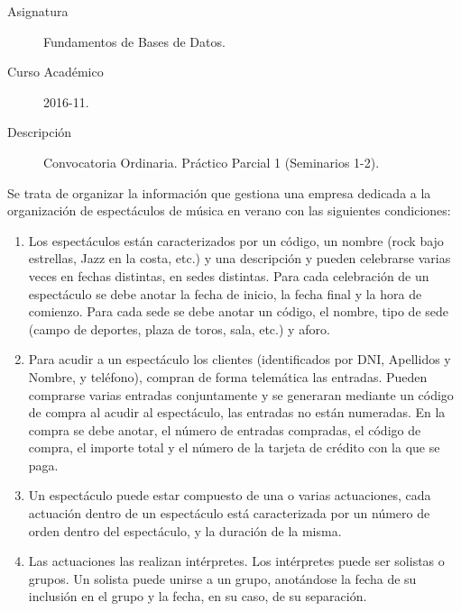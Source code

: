 \documentclass[12pt]{article}
\begin{document}

    
    

    \begin{description}
        \item[Asignatura] Fundamentos de Bases de Datos.
        \item[Curso Académico] 2016-11.
        \item[Descripción] Convocatoria Ordinaria. Práctico Parcial 1 (Seminarios 1-2).
    
    \end{description}
    \newpage

Se trata de organizar la información que gestiona una empresa dedicada a la organización de espectáculos de música en verano con las siguientes condiciones:
\begin{enumerate}
    \item Los espectáculos están caracterizados por un código, un nombre (rock bajo estrellas, Jazz en la costa, etc.) y una descripción y pueden celebrarse varias veces en fechas distintas, en sedes distintas. Para cada celebración de un espectáculo se debe anotar la fecha de inicio, la fecha final y la hora de comienzo. Para cada sede se debe anotar un código, el nombre, tipo de sede (campo de deportes, plaza de toros, sala, etc.) y aforo.
    \item Para acudir a un espectáculo los clientes (identificados por DNI, Apellidos y Nombre, y teléfono), compran de forma telemática las entradas. Pueden comprarse varias entradas conjuntamente y se generaran mediante un código de compra al acudir al espectáculo, las entradas no están numeradas. En la compra se debe anotar, el número de entradas compradas, el código de compra, el importe total y el número de la tarjeta de crédito con la que se paga.
    \item Un espectáculo puede estar compuesto de una o varias actuaciones, cada actuación dentro de un espectáculo está caracterizada por un número de orden dentro del espectáculo, y la duración de la misma.
    \item Las actuaciones las realizan intérpretes. Los intérpretes puede ser solistas o grupos. Un solista puede unirse a un grupo, anotándose la fecha de su inclusión en el grupo y la fecha, en su caso, de su separación.
\end{enumerate}
\end{document}
